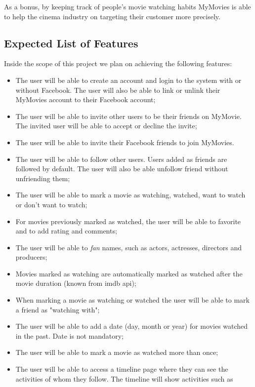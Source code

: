 As a bonus, by keeping track of people's movie watching habits MyMovies is able
to help the cinema industry on targeting their customer more precisely.

\subsection{Expected List of Features}

Inside the scope of this project we plan on achieving the following features:

\begin{itemize}
  \item The user will be able to create an account and login to the system with
    or without Facebook. The user will also be able to link or unlink their
    MyMovies account to their Facebook account;
  \item The user will be able to invite other users to be their friends on
    MyMovie. The invited user will be able to accept or decline the invite;
  \item The user will be able to invite their Facebook friends to join
    MyMovies.
  \item The user will be able to follow other users. Users added as friends are
    followed by default. The user will also be able unfollow friend without
    unfriending them;
  \item The user will be able to mark a movie as watching,
    watched, want to watch or don't want to watch;
  \item For movies previously marked as watched, the user will be able to
    favorite and to add rating and comments;
  \item The user will be able to \textit{fan} names, such as actors, actresses,
    directors and producers;
  \item Movies marked as watching are automatically marked as watched after the
    movie duration (known from imdb api);
  \item When marking a movie as watching or watched the user will be able to
    mark a friend as "watching with";
  \item The user will be able to add a date (day, month or year) for movies
    watched in the past. Date is not mandatory;
  \item The user will be able to mark a movie as watched more than once;
  \item The user will be able to access a timeline page where they can see the
    activities of whom they follow. The timeline will show activities such as

\end{itemize}
